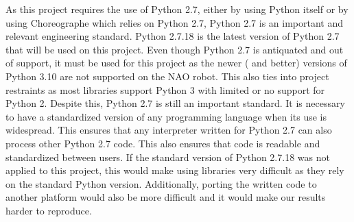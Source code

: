 As this project requires the use of Python 2.7, either by using Python itself or by using Choreographe which relies on Python 2.7, Python 2.7 is an important and relevant engineering standard. Python 2.7.18 is the latest version of Python 2.7 that will be used on this project. Even though Python 2.7 is antiquated and out of support, it must be used for this project as the newer ( and better) versions of Python 3.10 are not supported on the NAO robot. This also ties into project restraints as most libraries support Python 3 with limited or no support for Python 2. Despite this, Python 2.7 is still an important standard. It is necessary to have a standardized version of any programming language when its use is widespread. This ensures that any interpreter written for Python 2.7 can also process other Python 2.7 code. This also ensures that code is readable and standardized between users. If the standard version of Python 2.7.18 was not applied to this project, this would make using libraries very difficult as they rely on the standard Python version. Additionally, porting the written code to another platform would also be more difficult and it would make our results harder to reproduce. \cite{python} \par


